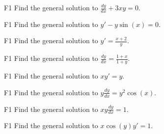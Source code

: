 \begin{problem}{F1}
Find the general solution to \(\frac{dy}{dx} + 3xy = 0\).
\end{problem}

\begin{problem}{F1}
Find the general solution to \(y' - y\sin(x)=0\).
\end{problem} 

\begin{problem}{F1}
Find the general solution to \(y' = \frac{x+2}{y}\).
\end{problem}

\begin{problem}{F1}
Find the general solution to \(\frac{dy}{dx} = \frac{1 + x}{1 + y}\).
\end{problem}

\begin{problem}{F1}
Find the general solution to \(xy' = y\).
\end{problem}

\begin{problem}{F1}
Find the general solution to \(y\frac{dy}{dx} = y^2\cos(x)\).
\end{problem}

\begin{problem}{F1}
Find the general solution to \(xy\frac{dy}{dx} = 1\).
\end{problem}

\begin{problem}{F1}
Find the general solution to \(x\cos(y)y' = 1\).
\end{problem}
